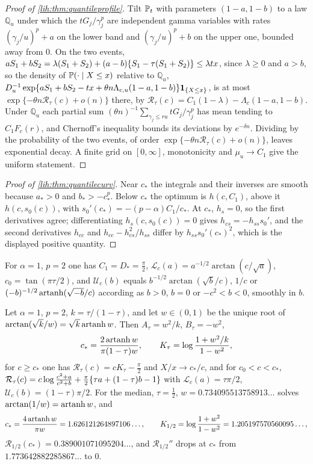 \begin{proof}[Proof of \cref{lih:thm:quantileprofile}]
Tilt $\mathbb{P}_t$ with parameters $(1-a,1-b)$ to a law $\mathbb Q_u$ under which the $tG_j/\gamma_j^p$ are independent gamma
variables with rates $(\gamma_j/u)^p+a$ on the lower band and $(\gamma_j/u)^p+b$ on the upper one, bounded away from $0$.
On the two events, $aS_1+bS_2=\lambda(S_1+S_2)+(a-b)\{S_1-\tau(S_1+S_2)\}\le\lambda tx$, since $\lambda\ge0$ and $a>b$, so the
density of $\mathbb{P}(\cdot\mid X\le x)$ relative to $\mathbb Q_u$,
$D_u^{-1}\exp\{aS_1+bS_2-tx+\theta n\Lambda_{c,u}(1-a,1-b)\}\mathbf{1}_{\{X\le x\}}$, is at most $\exp\{-\theta n\mathcal R_\tau(c)+o(n)\}$ there, by
$\mathcal R_\tau(c)=C_1(1-\lambda)-\Lambda_c(1-a,1-b)$. Under $\mathbb Q_u$ each partial sum $(\theta n)^{-1}\sum_{\gamma_j\le ru}tG_j/\gamma_j^p$ has mean
tending to $C_1F_c(r)$, and Chernoff's inequality bounds its deviations by $e^{-\delta n}$. Dividing by the
probability of the two events, of order $\exp\{-\theta n\mathcal R_\tau(c)+o(n)\}$, leaves exponential decay. A finite grid
on $[0,\infty]$, monotonicity and $\mu_u\to C_1$ give the uniform statement.
\end{proof}

\begin{proof}[Proof of \cref{lih:thm:quantilecurv}]
Near $c_*$ the integrals and their inverses are smooth because $a_*>0$ and $b_*>-c_*^p$. Below $c_*$ the
optimum is $h(c,C_1)$, above it $h(c,s_0(c))$, with $s_0'(c_*)=-(p-\alpha)C_1/c_*$. At $c_*$, $h_s=0$, so the first
derivatives agree; differentiating $h_s(c,s_0(c))=0$ gives $h_{cs}=-h_{ss}s_0'$, and the second derivatives
$h_{cc}$ and $h_{cc}-h_{cs}^2/h_{ss}$ differ by $h_{ss}s_0'(c_*)^2$, which is the displayed positive quantity.
\end{proof}

For $\alpha=1$, $p=2$ one has $C_1=D_*=\frac\pi2$, $\mathcal L_c(a)=a^{-1/2}\arctan(c/\sqrt a)$, $c_0=\tan(\pi\tau/2)$, and
$\mathcal U_c(b)$ equals $b^{-1/2}\arctan(\sqrt b/c)$, $1/c$ or $(-b)^{-1/2}\operatorname{artanh}(\sqrt{-b}/c)$ according as $b>0$, $b=0$ or
$-c^2<b<0$, smoothly in $b$.

\begin{corollary}\label{lih:cor:quantileexplicit}
Let $\alpha=1$, $p=2$, $k=\tau/(1-\tau)$, and let $w\in(0,1)$ be the unique root of $\arctan(\sqrt k/w)=\sqrt k\operatorname{artanh} w$. Then
$A_\tau=w^2/k$, $B_\tau=-w^2$,
\[
 c_*=\frac{2\operatorname{artanh} w}{\pi(1-\tau)w},\qquad K_\tau=\log\frac{1+w^2/k}{1-w^2},
\]
for $c\ge c_*$ one has $\mathcal R_\tau(c)=cK_\tau-\frac\pi2$ and $X/x\to c_*/c$, and for $c_0<c<c_*$,
$\mathcal R_\tau(c)=c\log\frac{c^2+a}{c^2+b}+\frac\pi2\{\tau a+(1-\tau)b-1\}$ with $\mathcal L_c(a)=\tau\pi/2$, $\mathcal U_c(b)=(1-\tau)\pi/2$. For the
median, $\tau=\frac12$, $w=0.734095513758913\ldots$ solves $\arctan(1/w)=\operatorname{artanh} w$, and
\[
 c_*=\frac{4\operatorname{artanh} w}{\pi w}=1.626121264897106\ldots,\qquad K_{1/2}=\log\frac{1+w^2}{1-w^2}=1.205197570560095\ldots,
\]
$\mathcal R_{1/2}(c_*)=0.389001071095204\ldots$, and $\mathcal R_{1/2}''$ drops at $c_*$ from $1.773642882285867\ldots$ to $0$.
\end{corollary}

